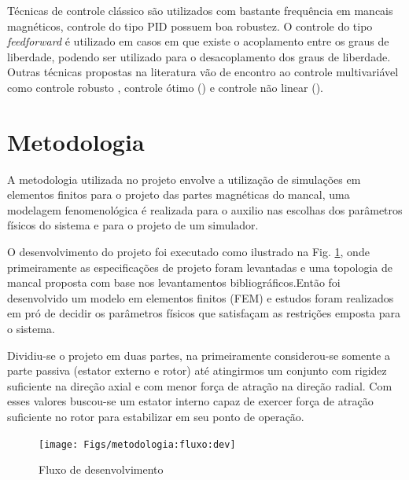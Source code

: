 Técnicas de controle clássico são utilizados com bastante frequência em mancais magnéticos, controle do tipo PID  \citep{Tezuka2013} possuem boa robustez. O controle  do tipo \textit{feedforward} é utilizado em casos em que existe o acoplamento entre os graus de liberdade, podendo ser utilizado para o desacoplamento dos graus de liberdade. Outras técnicas propostas na literatura vão de encontro ao controle multivariável como controle robusto \citep{Jimenez-Lizafrraga2007}, controle ótimo (\citep{Schuhmann2012}) e controle não linear (\citep{Rundell1996}).

\section{Metodologia}

A metodologia utilizada no projeto envolve a utilização de simulações em elementos finitos para o projeto das partes magnéticas do mancal, uma modelagem fenomenológica é realizada para o auxilio nas escolhas dos parâmetros físicos do sistema e para o projeto de um simulador.

O desenvolvimento do projeto foi executado como ilustrado na Fig. \ref{fig:metodologia:fluxo:dev}, onde primeiramente as especificações de projeto foram levantadas e uma topologia de mancal proposta com base nos levantamentos bibliográficos.Então foi desenvolvido um modelo em elementos finitos (FEM) e estudos foram realizados em pró de decidir os parâmetros físicos que satisfaçam as restrições emposta para o sistema.

Dividiu-se o projeto em duas partes, na primeiramente considerou-se somente a parte passiva (estator externo e rotor) até atingirmos um conjunto com rigidez suficiente na direção axial e com menor força de atração na direção radial. Com esses valores buscou-se um estator interno capaz de exercer força de atração suficiente no rotor para estabilizar em seu ponto de operação.

 
\begin{figure}[th!]
	\centering
	\texttt{[image: Figs/metodologia:fluxo:dev]}
	\caption{Fluxo de desenvolvimento}
	\label{fig:metodologia:fluxo:dev}
\end{figure}
 
 
 
% 
     
